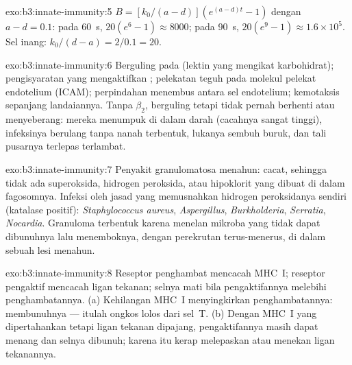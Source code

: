 \begin{solution}{exo:b3:innate-immunity:5}
$B = [k_{0}/(a-d)](e^{(a-d)t} - 1)$ dengan $a - d = 0.1$: pada \qty{60}{s},
$20(e^{6} - 1) \approx 8000$; pada \qty{90}{s}, $20(e^{9} - 1) \approx
1.6\times 10^{5}$. Sel inang: $k_{0}/(d - a) = 2/0.1 = 20$.
\end{solution}

\begin{solution}{exo:b3:innate-immunity:6}
Berguling pada  (lektin yang mengikat karbohidrat); pengisyaratan
 yang mengaktifkan ; pelekatan teguh  pada
molekul pelekat endotelium (ICAM); perpindahan menembus antara
sel endotelium; kemotaksis sepanjang landaiannya. Tanpa
 $\beta_{2}$,  berguling tetapi tidak pernah berhenti atau menyeberang:
mereka menumpuk di dalam darah (cacahnya sangat tinggi), infeksinya berulang tanpa
nanah terbentuk, lukanya sembuh buruk, dan tali pusarnya terlepas terlambat.
\end{solution}

\begin{solution}{exo:b3:innate-immunity:7}
Penyakit granulomatosa menahun:  cacat, sehingga tidak ada
superoksida, hidrogen peroksida, atau hipoklorit yang dibuat di dalam fagosomnya.
Infeksi oleh jasad yang memusnahkan hidrogen peroksidanya sendiri
(katalase positif): \emph{Staphylococcus aureus}, \emph{Aspergillus},
\emph{Burkholderia}, \emph{Serratia}, \emph{Nocardia}. Granuloma terbentuk
karena  menelan mikroba yang tidak dapat dibunuhnya lalu menemboknya,
dengan perekrutan terus-menerus, di dalam sebuah lesi menahun.
\end{solution}

\begin{solution}{exo:b3:innate-immunity:8}
Reseptor penghambat mencacah MHC~I; reseptor pengaktif mencacah ligan
tekanan; selnya mati bila pengaktifannya melebihi penghambatannya. (a) Kehilangan
MHC~I menyingkirkan penghambatannya:  membunuhnya --- itulah
ongkos lolos dari sel~T. (b) Dengan MHC~I yang dipertahankan tetapi ligan tekanan
dipajang, pengaktifannya masih dapat menang dan selnya dibunuh; 
karena itu kerap melepaskan atau menekan ligan tekanannya.
\end{solution}

